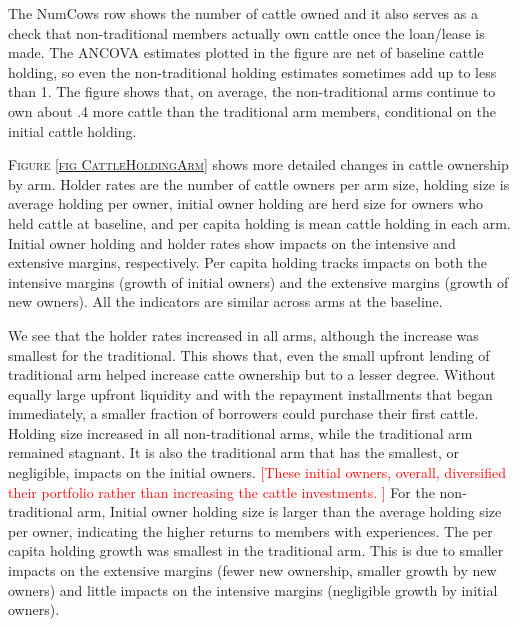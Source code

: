 	The \textsf{NumCows} row shows the number of cattle owned and it also serves as a check that non-\textsf{traditional} members actually own cattle once the loan/lease is made. The ANCOVA estimates plotted in the figure are net of baseline cattle holding, so even the non-traditional holding estimates sometimes add up to less than 1. %
	The figure shows that, on average, the non-\textsf{traditional} arms continue to own about .4 more cattle than the \textsf{traditional} arm members, conditional on the initial cattle holding. 
	
	\textsc{\footnotesize Figure \ref{fig CattleHoldingArm}} shows more detailed changes in cattle ownership by arm. Holder rates are the number of cattle owners per arm size, holding size is average holding per owner, initial owner holding are herd size for owners who held cattle at baseline, and per capita holding is mean cattle holding in each arm. Initial owner holding and holder rates show impacts on the intensive and extensive margins, respectively. Per capita holding tracks impacts on both the intensive margins (growth of initial owners) and the extensive margins (growth of new owners). All the indicators are similar across arms at the baseline. 
	
	We see that the holder rates increased in all arms, although the increase was smallest for the \textsf{traditional}. This shows that, even the small upfront lending of \textsf{traditional} arm helped increase catte ownership but to a lesser degree. Without equally large upfront liquidity and with the repayment installments that began immediately, a smaller fraction of borrowers could purchase their first cattle. Holding size increased in all non-\textsf{traditional} arms, while the \textsf{traditional} arm remained stagnant. It is also the \textsf{traditional} arm that has the smallest, or negligible, impacts on the initial owners. \textcolor{red}{[These initial owners, overall, diversified their portfolio rather than increasing the cattle investments. ]} For the non-\textsf{traditional} arm, Initial owner holding size is larger than the average holding size per owner, indicating the higher returns to members with experiences. The per capita holding growth was smallest in the \textsf{traditional} arm. This is due to smaller impacts on the extensive margins (fewer new ownership, smaller growth by new owners) and little impacts on the intensive margins (negligible growth by initial owners). 

